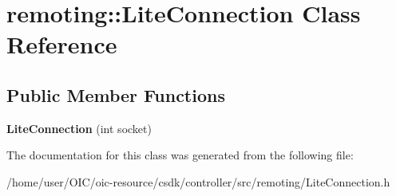 \hypertarget{classremoting_1_1LiteConnection}{}\section{remoting\+:\+:Lite\+Connection Class Reference}
\label{classremoting_1_1LiteConnection}
\subsection*{Public Member Functions}
\begin{DoxyCompactItemize}
\item 
\hypertarget{classremoting_1_1LiteConnection_ab028f9c2637f493a933640ecd76afb82}{}{\bfseries Lite\+Connection} (int socket)\label{classremoting_1_1LiteConnection_ab028f9c2637f493a933640ecd76afb82}

\end{DoxyCompactItemize}


The documentation for this class was generated from the following file\+:\begin{DoxyCompactItemize}
\item 
/home/user/\+O\+I\+C/oic-\/resource/csdk/controller/src/remoting/Lite\+Connection.\+h\end{DoxyCompactItemize}
